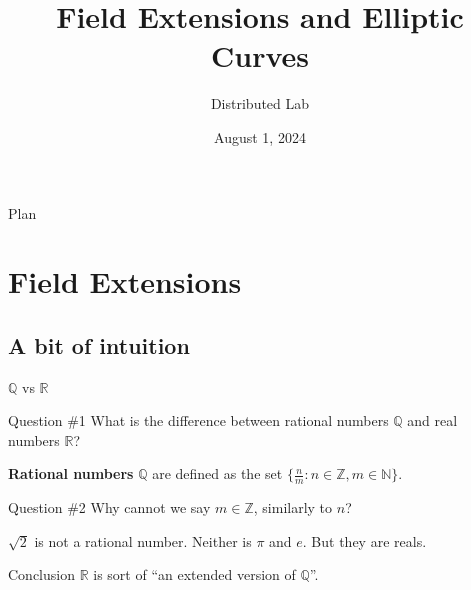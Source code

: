 \documentclass{zkdl-presentation-template}
\title[Field Extensions and Elliptic Curves]{\textbf{Field Extensions and Elliptic Curves}}
\author{Distributed Lab}
\date{August 1, 2024}
\begin{document}
  
    \begin{frame}{Plan}
      \tableofcontents
    \end{frame}

    \section{Field Extensions}

    \subsection{A bit of intuition}

    \begin{frame}{$\mathbb{Q}$ vs $\mathbb{R}$}
        \begin{alertblock}{Question \#1}
            What is the difference between rational numbers $\mathbb{Q}$ and real numbers $\mathbb{R}$?
        \end{alertblock}

        \begin{definition}
            \textbf{Rational numbers} $\mathbb{Q}$ are defined as the set $\{\frac{n}{m}: n \in \mathbb{Z}, m \in \mathbb{N}\}$.
        \end{definition}

        \begin{alertblock}{Question \#2}
            Why cannot we say $m \in \mathbb{Z}$, similarly to $n$?
        \end{alertblock}

        \begin{theorem}
            $\sqrt{2}$ is not a rational number. Neither is $\pi$ and $e$. But they are reals.
        \end{theorem}

        \begin{block}{Conclusion}
            $\mathbb{R}$ is sort of ``an extended version of $\mathbb{Q}$''.
        \end{block}
    \end{frame}
\end{document}
